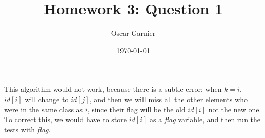 \documentclass{scrartcl}
\title{Homework 3: Question 1}
\author{Oscar Garnier}
\date{\today}
\begin{document}
\newcommand{\E}[1]{\section*{Exo #1}}
\newcommand{\CR}[2]{\section*{#1 // note : #2}}
\newcommand{\Q}[1]{\section*{Exercise #1}}
\newcommand{\SQ}[1]{\subsection*{Question #1}}
\maketitle

This algorithm would not work, because there is a subtle error: when \( k = i \), \( id[i] \) will change to \( id[j] \), and then we will miss all the other elements who were in the same class as \( i \), since their flag will be the old \( id[i] \) not the new one. To correct this, we would have to store \( id[i] \) as a \emph{flag} variable, and then run the tests with \emph{flag}.
\end{document}
